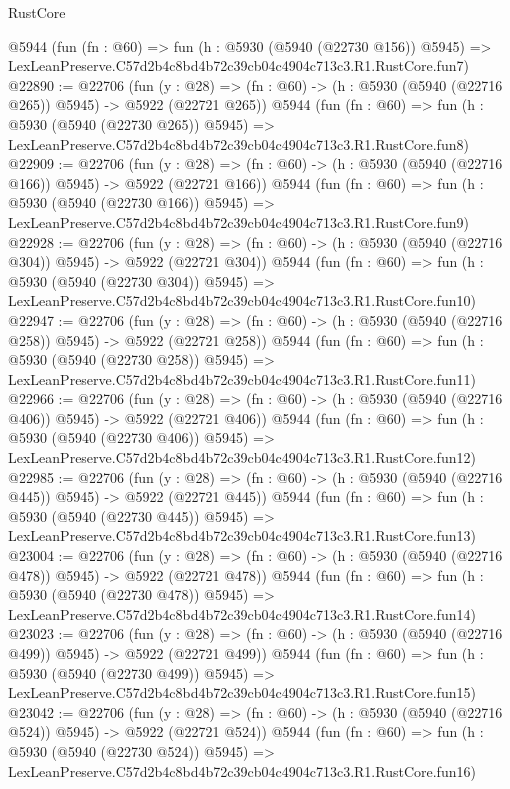 \begin{lexlean}{RustCore}
\begin{coremodule}
    @5944
    (fun (fn : @60) =>
    fun (h : @5930 (@5940 (@22730 @156)) @5945) =>
    LexLeanPreserve.C57d2b4c8bd4b72c39cb04c4904c713c3.R1.RustCore.fun7)
@22890 := @22706
    (fun (y : @28) => (fn : @60) -> (h : @5930 (@5940 (@22716 @265)) @5945) -> @5922 (@22721 @265))
    @5944
    (fun (fn : @60) =>
    fun (h : @5930 (@5940 (@22730 @265)) @5945) =>
    LexLeanPreserve.C57d2b4c8bd4b72c39cb04c4904c713c3.R1.RustCore.fun8)
@22909 := @22706
    (fun (y : @28) => (fn : @60) -> (h : @5930 (@5940 (@22716 @166)) @5945) -> @5922 (@22721 @166))
    @5944
    (fun (fn : @60) =>
    fun (h : @5930 (@5940 (@22730 @166)) @5945) =>
    LexLeanPreserve.C57d2b4c8bd4b72c39cb04c4904c713c3.R1.RustCore.fun9)
@22928 := @22706
    (fun (y : @28) => (fn : @60) -> (h : @5930 (@5940 (@22716 @304)) @5945) -> @5922 (@22721 @304))
    @5944
    (fun (fn : @60) =>
    fun (h : @5930 (@5940 (@22730 @304)) @5945) =>
    LexLeanPreserve.C57d2b4c8bd4b72c39cb04c4904c713c3.R1.RustCore.fun10)
@22947 := @22706
    (fun (y : @28) => (fn : @60) -> (h : @5930 (@5940 (@22716 @258)) @5945) -> @5922 (@22721 @258))
    @5944
    (fun (fn : @60) =>
    fun (h : @5930 (@5940 (@22730 @258)) @5945) =>
    LexLeanPreserve.C57d2b4c8bd4b72c39cb04c4904c713c3.R1.RustCore.fun11)
@22966 := @22706
    (fun (y : @28) => (fn : @60) -> (h : @5930 (@5940 (@22716 @406)) @5945) -> @5922 (@22721 @406))
    @5944
    (fun (fn : @60) =>
    fun (h : @5930 (@5940 (@22730 @406)) @5945) =>
    LexLeanPreserve.C57d2b4c8bd4b72c39cb04c4904c713c3.R1.RustCore.fun12)
@22985 := @22706
    (fun (y : @28) => (fn : @60) -> (h : @5930 (@5940 (@22716 @445)) @5945) -> @5922 (@22721 @445))
    @5944
    (fun (fn : @60) =>
    fun (h : @5930 (@5940 (@22730 @445)) @5945) =>
    LexLeanPreserve.C57d2b4c8bd4b72c39cb04c4904c713c3.R1.RustCore.fun13)
@23004 := @22706
    (fun (y : @28) => (fn : @60) -> (h : @5930 (@5940 (@22716 @478)) @5945) -> @5922 (@22721 @478))
    @5944
    (fun (fn : @60) =>
    fun (h : @5930 (@5940 (@22730 @478)) @5945) =>
    LexLeanPreserve.C57d2b4c8bd4b72c39cb04c4904c713c3.R1.RustCore.fun14)
@23023 := @22706
    (fun (y : @28) => (fn : @60) -> (h : @5930 (@5940 (@22716 @499)) @5945) -> @5922 (@22721 @499))
    @5944
    (fun (fn : @60) =>
    fun (h : @5930 (@5940 (@22730 @499)) @5945) =>
    LexLeanPreserve.C57d2b4c8bd4b72c39cb04c4904c713c3.R1.RustCore.fun15)
@23042 := @22706
    (fun (y : @28) => (fn : @60) -> (h : @5930 (@5940 (@22716 @524)) @5945) -> @5922 (@22721 @524))
    @5944
    (fun (fn : @60) =>
    fun (h : @5930 (@5940 (@22730 @524)) @5945) =>
    LexLeanPreserve.C57d2b4c8bd4b72c39cb04c4904c713c3.R1.RustCore.fun16)

\end{coremodule}
\end{lexlean}
